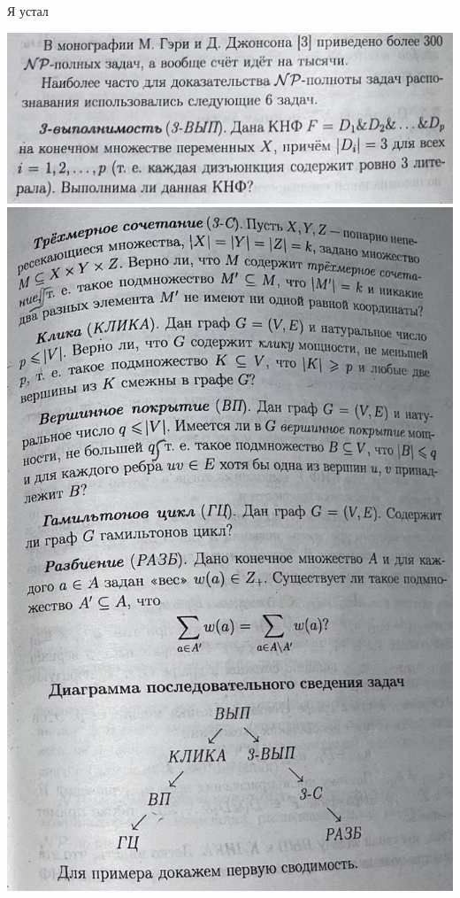 \newpage

\begin{note}
    Я устал

    \includegraphics[scale=0.1]{figures/need2.png}
    \includegraphics[scale=0.1]{figures/need1.png}
\end{note}
